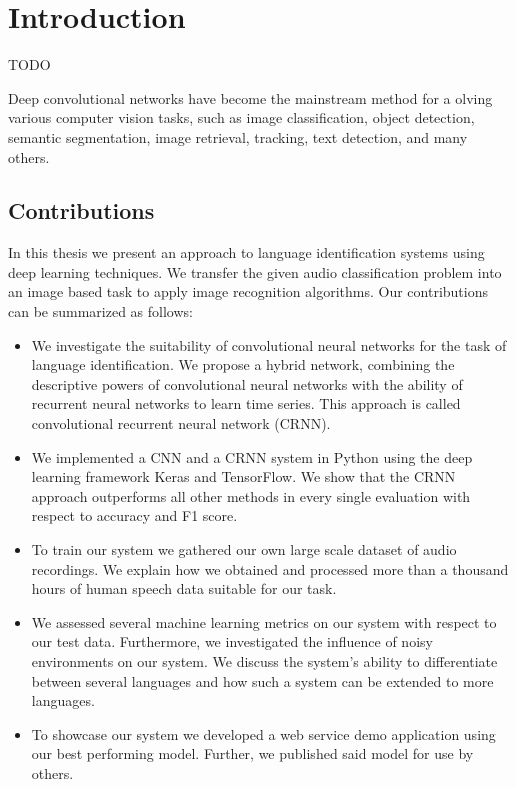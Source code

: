 \section{Introduction}

TODO

Deep convolutional networks have become the mainstream method for a olving various computer vision tasks, such as image classification\cite{russakovsky2015imagenet}, object detection\cite{russakovsky2015imagenet, everingham2010pascal}, semantic segmentation\cite{dai2016instance, girshick2014rich}, image retrieval\cite{tolias2015particular}, tracking\cite{nam2016learning}, text detection\cite{jaderberg2014synthetic}, and many others.

\subsection{Contributions}
In this thesis we present an approach to language identification systems using deep learning techniques. We transfer the given audio classification problem into an image based task to apply image recognition algorithms. Our contributions can be summarized as follows:
\begin{itemize}
	\item We investigate the suitability of convolutional neural networks for the task of language identification. We propose a hybrid network, combining the descriptive powers of convolutional neural networks with the ability of recurrent neural networks to learn time series. This approach is called convolutional recurrent neural network (CRNN). 
	\item We implemented a CNN and a CRNN system in Python using the deep learning framework Keras and TensorFlow. We show that the CRNN approach outperforms all other methods in every single evaluation with respect to accuracy and F1 score.
	\item To train our system we gathered our own large scale dataset of audio recordings. We explain how we obtained and processed more than a thousand hours of human speech data suitable for our task.
	\item We assessed several machine learning metrics on our system with respect to our test data. Furthermore, we investigated the influence of noisy environments on our system. We discuss the system's ability to differentiate between several languages and how such a system can be extended to more languages.
	\item To showcase our system we developed a web service demo application using our best performing model. Further, we published said model for use by others.
\end{itemize} 


